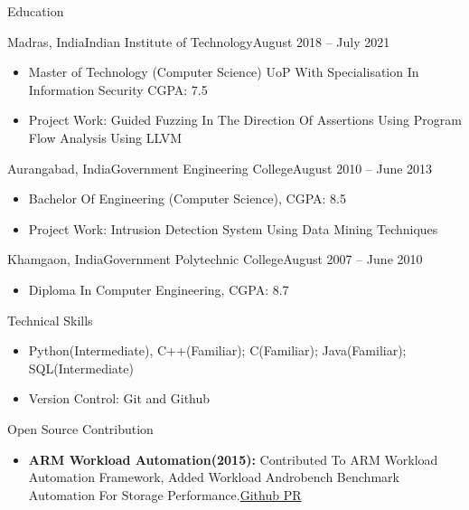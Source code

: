 \documentclass[]{mcdowellcv}
\begin{document}
	\begin{cvsection}{Education}
	\begin{cvsubsection}{Madras, India}{Indian Institute of Technology}{August 2018 -- July 2021}
			\begin{itemize}
				\item Master of Technology (Computer Science) UoP With Specialisation In Information Security CGPA: 7.5		
				\item Project Work: Guided Fuzzing In The Direction Of Assertions Using Program Flow Analysis Using LLVM 
			\end{itemize}
		\end{cvsubsection}
		
		\begin{cvsubsection}{Aurangabad, India}{Government Engineering College}{August 2010 -- June 2013}
			\begin{itemize}
				\item Bachelor Of Engineering (Computer Science), CGPA: 8.5
				\item Project Work: Intrusion Detection System Using Data Mining Techniques
			\end{itemize}
		\end{cvsubsection}
		\begin{cvsubsection}{Khamgaon, India}{Government Polytechnic College}{August 2007 -- June 2010}
			\begin{itemize}
				\item Diploma In Computer Engineering, CGPA: 8.7
			\end{itemize}
		\end{cvsubsection}
	\end{cvsection}
	
	\begin{cvsection}{Technical Skills}
		\begin{cvsubsection}{}{}{}	
			\begin{itemize}
				\item Python(Intermediate), C++(Familiar); C(Familiar); Java(Familiar); SQL(Intermediate)
				\item Version Control: Git and Github
			\end{itemize}
		\end{cvsubsection}
	\end{cvsection}
	
	\begin{cvsection}{Open Source Contribution}
		\begin{cvsubsection}{}{}{}	
			\begin{itemize}
				\item \textbf{ARM Workload Automation(2015):} Contributed To ARM Workload Automation Framework,  Added Workload Androbench Benchmark Automation For Storage Performance.\href{https://github.com/ARM-software/workload-automation/pull/45}{Github PR}

			\end{itemize}
		\end{cvsubsection}
	\end{cvsection}
	
\end{document}
